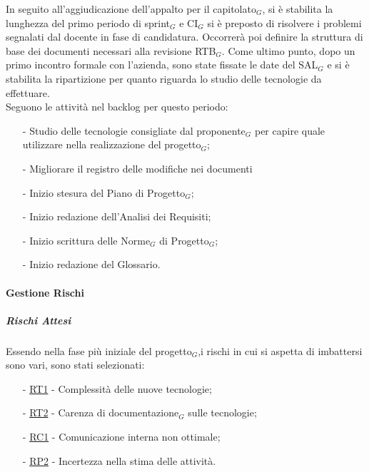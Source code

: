 \documentclass[10pt]{article}
\begin{document}
{{    In seguito all'aggiudicazione dell'appalto per il capitolato$_G$, si è stabilita la lunghezza del primo periodo di sprint$_G$ e CI$_G$ si è preposto di risolvere i problemi segnalati dal docente in fase di candidatura. Occorrerà poi definire la struttura di base dei documenti necessari alla revisione RTB$_G$. Come ultimo punto, dopo un primo incontro formale con l'azienda, sono state fissate le date del SAL$_G$ e si è stabilita la ripartizione per quanto riguarda lo studio delle tecnologie da effettuare.\\
    Seguono le attività nel backlog per questo periodo:
    \vspace{-0.5em}
    \begin{itemize}
    \setlength\itemsep{-0.2em}
    \item [-] Studio delle tecnologie consigliate dal proponente$_G$ per capire quale utilizzare nella realizzazione del progetto$_G$;
    \item [-] Migliorare il registro delle modifiche nei documenti 
    \item [-] Inizio stesura del Piano di Progetto$_G$;
    \item [-] Inizio redazione dell'Analisi dei Requisiti;
    \item [-] Inizio scrittura delle Norme$_G$ di Progetto$_G$;
    \item [-] Inizio redazione del Glossario.
    \end{itemize}

    \paragraph{Gestione Rischi}\mbox{}
    \vspace{-1em}
    \subparagraph*{Rischi Attesi}\mbox{}

    Essendo nella fase più iniziale del progetto$_G$,i rischi in cui si aspetta di imbattersi sono vari, sono stati selezionati:
    \vspace{-0.5em}
    \begin{itemize}
    \setlength\itemsep{-0.2em}
    \item [-] \hyperref[RT1]{RT1} - Complessità delle nuove tecnologie;
    \item [-] \hyperref[RT2]{RT2} - Carenza di documentazione$_G$ sulle tecnologie;
    \item [-] \hyperref[RC1]{RC1} - Comunicazione interna non ottimale;
    \item [-] \hyperref[RP2]{RP2} - Incertezza nella stima delle attività.
    \end{itemize}

}}
\end{document}
